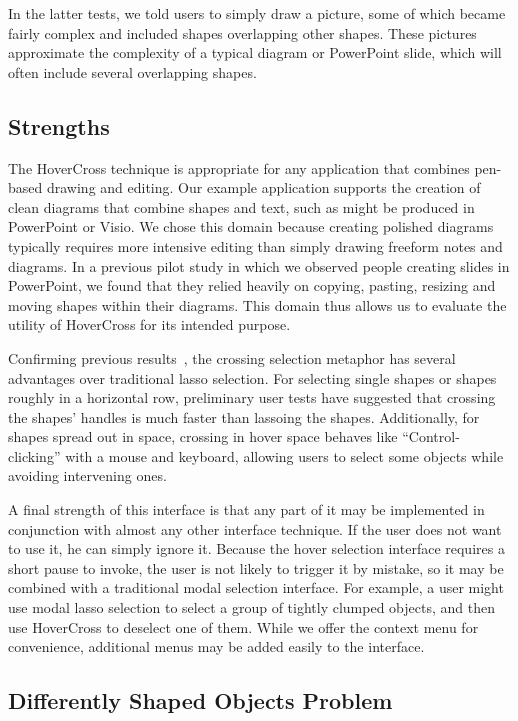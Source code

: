 \documentclass{article}
\begin{document}
In the latter tests, we told users to simply draw a picture, some of which became fairly complex and included shapes overlapping other shapes.  These pictures approximate the complexity of a typical diagram or PowerPoint slide, which will often include several overlapping shapes.

\subsection{Strengths}

The HoverCross technique is appropriate for any application that
combines pen-based drawing and editing.  Our example application
supports the creation of clean diagrams that combine shapes and text,
such as might be produced in PowerPoint or Visio.  We chose this
domain because creating polished diagrams typically requires more
intensive editing than simply drawing freeform notes and diagrams.  In
a previous pilot study in which we observed people creating slides in
PowerPoint, we found that they relied heavily on copying, pasting,
resizing and moving shapes within their diagrams.  This domain thus
allows us to evaluate the utility of HoverCross for its intended
purpose.

Confirming previous results~\cite{Apitz2004Crossy}, the crossing
selection metaphor has several advantages over traditional lasso
selection.  For selecting single shapes or shapes roughly in a
horizontal row, preliminary user tests have suggested that crossing the shapes' handles is much faster than
lassoing the shapes.  Additionally, for shapes spread out in space, crossing
in hover space behaves like ``Control-clicking'' with a mouse and
keyboard, allowing users to select some objects while avoiding
intervening ones.

A final strength of this interface is that any part of it may be
implemented in conjunction with almost any other interface technique.  If the user does not want to use it, he can simply ignore it.  Because
the hover selection interface requires a short pause to invoke, the
user is not likely to trigger it by mistake, so it may be combined
with a traditional modal selection interface.  For example, a user
might use modal lasso selection to select a group of tightly clumped
objects, and then use HoverCross to deselect one of them.  While we
offer the context menu for convenience, additional menus may be added
easily to the interface.

\subsection{Differently Shaped Objects Problem}
\end{document}
